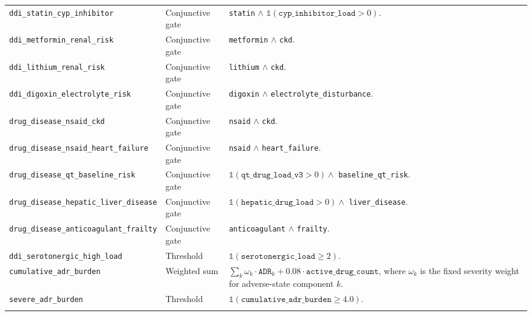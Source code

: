 \begin{longtable}{@{}p{}p{}p{}@{}}
\texttt{ddi\_statin\_cyp\_inhibitor} & Conjunctive gate & \texttt{statin} $\land$ $\mathbb{1}(\texttt{cyp\_inhibitor\_load} > 0)$. \\
\addlinespace

\texttt{ddi\_metformin\_renal\_risk} & Conjunctive gate & \texttt{metformin} $\land$ \texttt{ckd}. \\
\addlinespace

\texttt{ddi\_lithium\_renal\_risk} & Conjunctive gate & \texttt{lithium} $\land$ \texttt{ckd}. \\
\addlinespace

\texttt{ddi\_digoxin\_electrolyte\_risk} & Conjunctive gate & \texttt{digoxin} $\land$ \texttt{electrolyte\_disturbance}. \\
\addlinespace

\texttt{drug\_disease\_nsaid\_ckd} & Conjunctive gate & \texttt{nsaid} $\land$ \texttt{ckd}. \\
\addlinespace

\texttt{drug\_disease\_nsaid\_heart\_failure} & Conjunctive gate & \texttt{nsaid} $\land$ \texttt{heart\_failure}. \\
\addlinespace

\texttt{drug\_disease\_qt\_baseline\_risk} & Conjunctive gate & $\mathbb{1}(\texttt{qt\_drug\_load\_v3} > 0) \land$ \texttt{baseline\_qt\_risk}. \\
\addlinespace

\texttt{drug\_disease\_hepatic\_liver\_disease} & Conjunctive gate & $\mathbb{1}(\texttt{hepatic\_drug\_load} > 0) \land$ \texttt{liver\_disease}. \\
\addlinespace

\texttt{drug\_disease\_anticoagulant\_frailty} & Conjunctive gate & \texttt{anticoagulant} $\land$ \texttt{frailty}. \\
\addlinespace

\texttt{ddi\_serotonergic\_high\_load} & Threshold & $\mathbb{1}(\texttt{serotonergic\_load} \geq 2)$. \\
\addlinespace

\texttt{cumulative\_adr\_burden} & Weighted sum & $\sum_k \omega_k \cdot \texttt{ADR}_k + 0.08 \cdot \texttt{active\_drug\_count}$, where $\omega_k$ is the fixed severity weight for adverse-state component $k$. \\
\addlinespace

\texttt{severe\_adr\_burden} & Threshold & $\mathbb{1}(\texttt{cumulative\_adr\_burden} \geq 4.0)$. \\
\addlinespace


\end{longtable}
